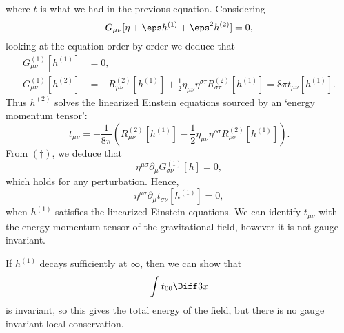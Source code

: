 \documentclass[12pt]{article}
\begin{document}
where $t$ is what we had in the previous equation. Considering
\[
	G_{\mu\nu}[\eta + \eps h^{(1)} + \eps^2 h^{(2)}] = 0,
\]
looking at the equation order by order we deduce that
\begin{align*}
	G_{\mu\nu}^{(1)}[h^{(1)}] &= 0, \\
	G_{\mu\nu}^{(1)} [h^{(2)}] &= - R_{\mu\nu}^{(2)} [h^{(1)}] + \frac 12 \eta_{\mu\nu} \eta^{\sigma\tau} R_{\sigma\tau}^{(2)} [h^{(1)}] = 8 \pi t_{\mu\nu} [h^{(1)}].
\end{align*}
Thus $h^{(2)}$ solves the linearized Einstein equations sourced by an `energy momentum tensor':
\[
	t_{\mu\nu} = - \frac{1}{8 \pi} \left(R^{(2)}_{\mu\nu}[h^{(1)}] - \frac 12 \eta_{\mu\nu} \eta^{\rho\sigma} R^{(2)}_{\rho\sigma}[h^{(1)}]\right).
\]
From $(\dagger)$, we deduce that
\[
	\eta^{\mu\sigma} \partial_\mu G_{\sigma\nu}^{(1)}[h] = 0,
\]
which holds for any perturbation. Hence,
\[
	\eta^{\mu\sigma} \partial_\mu t_{\sigma\nu} [h^{(1)}] = 0,
\]
when $h^{(1)}$ satisfies the linearized Einstein equations. We can identify $t_{\mu\nu}$ with the energy-momentum tensor of the gravitational field, however it is not gauge invariant.

If $h^{(1)}$ decays sufficiently at $\infty$, then we can show that
\[
\int t_{00} \Diff 3 x
\]
is invariant, so this gives the total energy of the field, but there is no gauge invariant local conservation.
\end{document}
